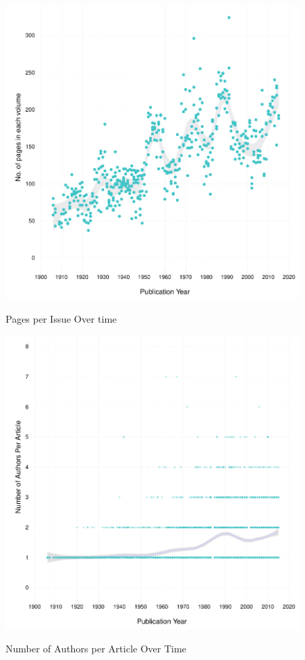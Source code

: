 \documentclass[12pt]{article}
\begin{document}
\begin{figure}[htbp]
\centering
\caption{Pages per Issue Over time}
\includegraphics[scale=.85]{../figs/pages_per_issue_over_time.pdf}
\label{fig:issue}
\end{figure}

\begin{figure}[htbp]
\centering
\caption{Number of Authors per Article Over Time}
\includegraphics[scale=.85]{../figs/n_authors_per_article_over_time.pdf}
\label{fig:nauthors}
\end{figure}
\end{document}
